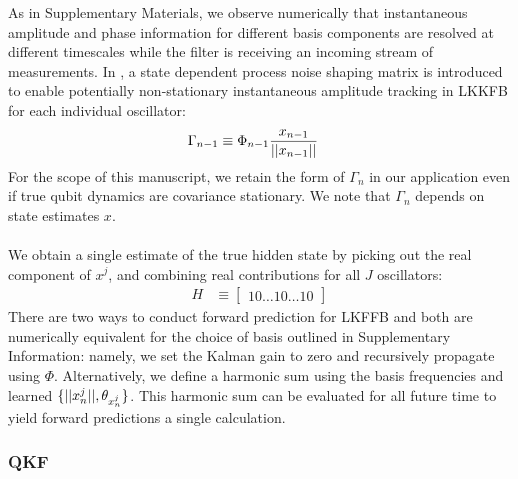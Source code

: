 As in Supplementary Materials, we observe numerically that instantaneous amplitude and phase information for different basis components are resolved at different timescales while the filter is receiving an incoming stream of measurements. 
In \cite{livska2007}, a state dependent process noise shaping matrix is introduced to enable potentially non-stationary instantaneous amplitude tracking in LKKFB for each individual oscillator:
\begin{align}
\Gamma_{n-1} &\equiv \Phi_{n-1}\frac{x_{n-1}}{||x_{n-1}||}
\end{align}
For the scope of this manuscript, we retain the form of $\Gamma_{n}$ in our application even if true qubit dynamics are covariance stationary. We note that $\Gamma_{n}$ depends on state estimates $x$. 
\\
\\
We obtain a single estimate of the true hidden state by  picking out the real component of $x^j$, and combining real contributions for all $J$ oscillators:
\begin{align}
H & \equiv \begin{bmatrix} 1 0 \hdots 1 0 \hdots 1 0 \end{bmatrix}
\end{align}
There are two ways to conduct forward prediction for LKFFB and both are numerically equivalent for the choice of basis outlined in Supplementary Information: namely, we set the Kalman gain to zero and recursively propagate using $\Phi$. Alternatively, we define a harmonic sum using the basis frequencies and learned $\{||x^j_n||, \theta_{x^j_n} \}$.  This harmonic sum can be evaluated for all future time to yield forward predictions a single calculation. 

\subsubsection{QKF}

